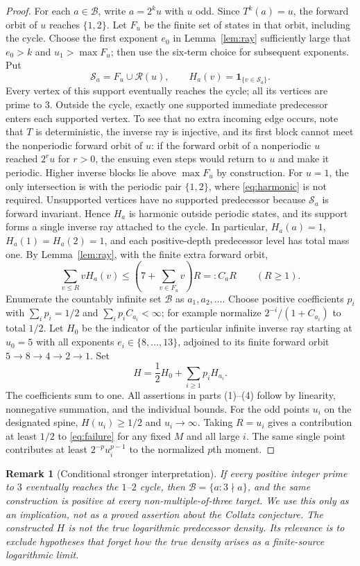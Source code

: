 \documentclass[11pt,a4paper]{article}
\newtheorem{remark}[theorem]{Remark}
\newcommand{\ind}{\mathbf 1}
\begin{document}
\begin{proof}
For each $a\in\mathcal B$, write $a=2^ku$ with $u$ odd. Since
$T^k(a)=u$, the forward orbit of $u$ reaches $\{1,2\}$.
Let $F_u$ be the finite set of states in that orbit, including the
cycle. Choose the first exponent $e_0$ in Lemma~\ref{lem:ray}
sufficiently large that $e_0>k$ and $u_1>\max F_u$; then use the
six-term choice for subsequent exponents. Put
\[
 \mathcal S_a=F_u\cup\mathcal R(u),\qquad
 H_a(v)=\ind_{\{v\in\mathcal S_a\}}.
\]
Every vertex of this support eventually reaches the cycle; all its
vertices are prime to $3$. Outside the cycle, exactly one supported
immediate predecessor enters each supported vertex. To see that no
extra incoming edge occurs, note that $T$ is deterministic, the
inverse ray is injective, and its first block cannot meet the
nonperiodic forward orbit of $u$: if the forward orbit of a
nonperiodic $u$ reached $2^ru$ for $r>0$, the ensuing even steps
would return to $u$ and make it periodic. Higher inverse blocks
lie above $\max F_u$ by construction. For $u=1$, the only
intersection is with the periodic pair $\{1,2\}$, where
\eqref{eq:harmonic} is not required. Unsupported vertices have no
supported predecessor because $\mathcal S_a$ is forward invariant.
Hence $H_a$ is harmonic outside periodic states, and its support
forms a single inverse ray attached to the cycle. In particular,
$H_a(a)=1$, $H_a(1)=H_a(2)=1$, and each positive-depth predecessor
level has total mass one.
By Lemma~\ref{lem:ray}, with the finite extra forward orbit,
\[
 \sum_{v\le R}vH_a(v)\le (7+\sum_{v\in F_u}v)R=:C_aR
 \qquad(R\ge1).
\]
Enumerate the countably infinite set $\mathcal B$ as $a_1,a_2,\dots$.
Choose positive coefficients $p_i$ with
$\sum_i p_i=1/2$ and $\sum_i p_i C_{a_i}<\infty$;
for example normalize $2^{-i}/(1+C_{a_i})$ to total $1/2$.
Let $H_0$ be the indicator of the particular infinite inverse ray
starting at $u_0=5$ with all exponents $e_i\in\{8,\dots,13\}$,
adjoined to its finite forward orbit $5\to8\to4\to2\to1$.
Set
\[
 H=\frac12 H_0+\sum_{i\ge1}p_iH_{a_i}.
\]
The coefficients sum to one. All assertions in parts (1)--(4)
follow by linearity, nonnegative summation, and the individual bounds.
For the odd points $u_i$ on the designated spine, $H(u_i)\ge1/2$
and $u_i\to\infty$. Taking $R=u_i$ gives a contribution at least
$1/2$ to \eqref{eq:failure} for any fixed $M$ and all large $i$.
The same single point contributes at least
$2^{-p}u_i^{p-1}$ to the normalized $p$th moment.
\end{proof}
\begin{remark}[Conditional stronger interpretation]
If every positive integer prime to $3$ eventually reaches the
$1$--$2$ cycle, then $\mathcal B=\{a:3\nmid a\}$,
and the same construction is positive at \emph{every}
non-multiple-of-three target. We use this only as an implication,
not as a proved assertion about the Collatz conjecture.
The constructed $H$ is not the true logarithmic predecessor density.
Its relevance is to exclude hypotheses that forget how the true
density arises as a finite-source logarithmic limit.
\end{remark}
\end{document}
